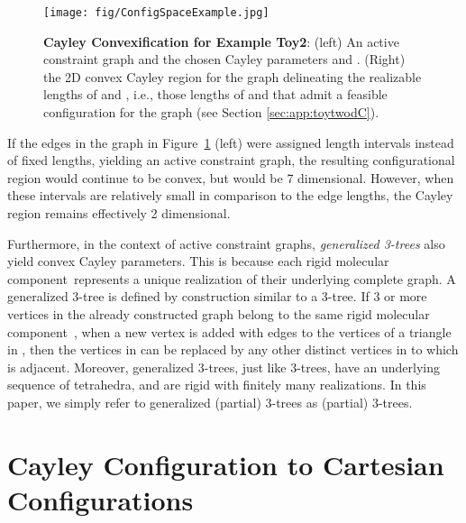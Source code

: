 \documentclass[]{article}
\newcommand{\figref}[1]{Figure~\ref{#1}}
\newcommand{\rmc}{rigid molecular component}
\newcommand{\toytwodtwo}{Toy2}
\begin{document}
\begin{figure}[htpb]
\begin{center}
\texttt{[image: fig/ConfigSpaceExample.jpg]}
\end{center}
\caption{\scriptsize \textbf{Cayley Convexification for Example {\toytwodtwo}}: (left) An
active constraint graph and the chosen Cayley parameters  and . 
(Right) the 2D convex Cayley region for the 
graph delineating the realizable lengths of  and , i.e., those lengths 
of  and  that admit a feasible configuration for the graph (see Section 
\ref{sec:app:toytwodC}).}
\label{fig:2DCayley}
\end{figure}

If the edges in the graph in \figref{fig:2DCayley} (left) were assigned length
intervals instead of fixed lengths, yielding an active constraint graph, the
resulting configurational region would continue to be convex, but would be 7
dimensional. However, when these intervals are relatively small in comparison
to the edge lengths, the Cayley region remains effectively 2
dimensional.\hfill

Furthermore, in the context of active constraint graphs, 
\emph{generalized 3-trees} also yield convex Cayley parameters. This is because
each \rmc\ represents a unique realization of their underlying complete
graph. A generalized 3-tree is defined by construction similar to a 3-tree.
If 3 or more vertices in the already
constructed graph  belong to the same \rmc\ , when a new vertex
 is added with edges to the vertices of a triangle  in , then
the  vertices in  can be replaced by any other  distinct
vertices in  to which  is adjacent.  Moreover, generalized 3-trees, just
like 3-trees, have an underlying sequence of tetrahedra, and are rigid with
finitely many realizations.  In this paper, we simply refer to generalized
(partial) 3-trees as (partial) 3-trees. 



\section{Cayley Configuration to Cartesian Configurations}
\label{sec:app:realization}
\end{document}

